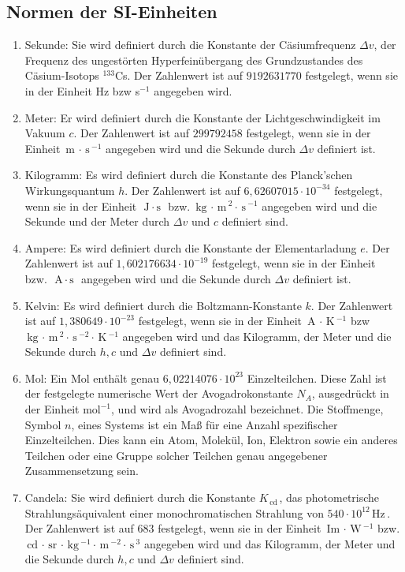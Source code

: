 \documentclass[a4paper,12pt]{article}
\begin{document}
\subsection{Normen der SI-Einheiten}
\begin{enumerate}[label=$\cdot$]
        \item Sekunde: Sie wird definiert durch die Konstante der Cäsiumfrequenz $\Delta v$, der Frequenz des ungestörten Hyperfeinübergang des Grundzustandes des Cäsium-Isotops $^{133}$Cs. Der Zahlenwert ist auf $9192631770$ festgelegt, wenn sie in der Einheit Hz bzw s$^{-1}$ angegeben wird. 
        \item Meter: Er wird definiert durch die Konstante der Lichtgeschwindigkeit im Vakuum $c$. Der Zahlenwert ist auf $299792458$ festgelegt, wenn sie in der Einheit $\,\text{m}\,\cdot \,\text{s}\,^{-1}$ angegeben wird und die Sekunde durch $\Delta v$ definiert ist.
        \item Kilogramm: Es wird definiert durch die Konstante des Planck'schen Wirkungsquantum $h$. Der Zahlenwert ist auf $6,62607015\cdot 10^{-34}$ festgelegt, wenn sie in der Einheit $\,\text{J}\,\cdot \,\text{s}\,$ bzw. $\,\text{kg}\,\cdot \,\text{m}\,^2\cdot \,\text{s}\, ^{-1} $ angegeben wird und die Sekunde und der Meter durch $\Delta v$ und $c$ definiert sind.
        \item Ampere: Es wird definiert durch die Konstante der Elementarladung $e$. Der Zahlenwert ist auf $1,602176634\cdot 10^{-19}$ festgelegt, wenn sie in der Einheit \,\, bzw. $\,\text{A}\,\cdot \,\text{s}\,$ angegeben wird und die Sekunde durch $\Delta v$ definiert ist.
        \item Kelvin: Es wird definiert durch die Boltzmann-Konstante $k$. Der Zahlenwert ist auf $1,380649\cdot 10^{-23}$ festgelegt, wenn sie in der Einheit $\,\text{A}\,\cdot \,\text{K}\,^{-1}$ bzw $\,\text{kg}\,\cdot \,\text{m}\,^2\cdot \,\text{s}\,^{-2}\cdot \,\text{K}\,^{-1}$ angegeben wird und das Kilogramm, der Meter und die Sekunde durch $h,c$ und $\Delta v$ definiert sind.
        \item Mol: Ein Mol enthält genau $6,02214076\cdot 10^{23}$ Einzelteilchen. Diese Zahl ist der festgelegte numerische Wert der Avogadrokonstante $N_A$, ausgedrückt in der Einheit $\text{mol}^{-1}$, und wird als Avogadrozahl bezeichnet. Die Stoffmenge, Symbol $n$, eines Systems ist ein Maß für eine Anzahl spezifischer Einzelteilchen. Dies kann ein Atom, Molekül, Ion, Elektron sowie ein anderes Teilchen oder eine Gruppe solcher Teilchen genau angegebener Zusammensetzung sein.
        \item Candela: Sie wird definiert durch die Konstante $K_{\,\text{cd}\,}$, das photometrische Strahlungsäquivalent einer monochromatischen Strahlung von $540\cdot 10^{12}\,\text{Hz}\,$. Der Zahlenwert ist auf $683$ festgelegt, wenn sie in der Einheit $\,\text{Im}\,\cdot \,\text{W}\,^{-1}$ bzw. $\,\text{cd}\,\cdot \,\text{sr}\,\cdot \,\text{kg}\,^{-1}\cdot \,\text{m}\, ^{-2}\cdot \,\text{s}\, ^{3}$ angegeben wird und das Kilogramm, der Meter und die Sekunde durch $h,c$ und $\Delta v$ definiert sind.
\end{enumerate}
\end{document}
